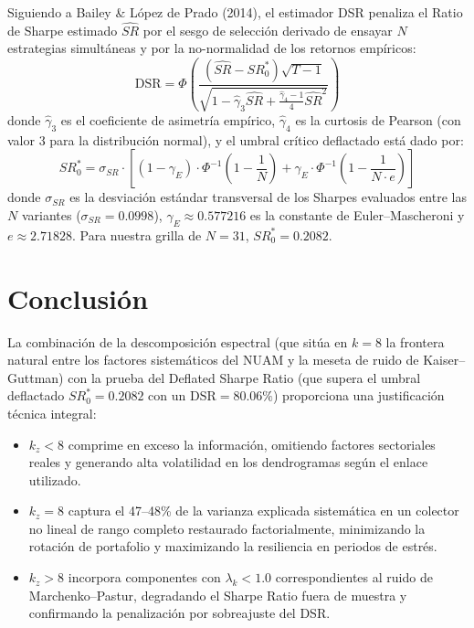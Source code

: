 \documentclass[11pt,a4paper]{article}
\begin{document}
Siguiendo a Bailey \& López de Prado (2014), el estimador DSR penaliza el Ratio de Sharpe estimado $\widehat{SR}$ por el sesgo de selección derivado de ensayar $N$ estrategias simultáneas y por la no-normalidad de los retornos empíricos:
\begin{equation}
\text{DSR} = \Phi\left( \frac{(\widehat{SR} - SR_0^*) \sqrt{T-1}}{\sqrt{1 - \hat{\gamma}_3 \widehat{SR} + \frac{\hat{\gamma}_4 - 1}{4} \widehat{SR}^2}} \right)
\end{equation}
donde $\hat{\gamma}_3$ es el coeficiente de asimetría empírico, $\hat{\gamma}_4$ es la curtosis de Pearson (con valor 3 para la distribución normal), y el umbral crítico deflactado está dado por:
\begin{equation}
SR_0^* = \sigma_{SR} \cdot \left[ (1 - \gamma_E) \cdot \Phi^{-1}\left(1 - \frac{1}{N}\right) + \gamma_E \cdot \Phi^{-1}\left(1 - \frac{1}{N \cdot e}\right) \right]
\end{equation}
donde $\sigma_{SR}$ es la desviación estándar transversal de los Sharpes evaluados entre las $N$ variantes ($\sigma_{SR} = 0.0998$), $\gamma_E \approx 0.577216$ es la constante de Euler--Mascheroni y $e \approx 2.71828$. Para nuestra grilla de $N = 31$, $SR_0^* = 0.2082$.

\section{Conclusión}

La combinación de la descomposición espectral (que sitúa en $k=8$ la frontera natural entre los factores sistemáticos del NUAM y la meseta de ruido de Kaiser--Guttman) con la prueba del Deflated Sharpe Ratio (que supera el umbral deflactado $SR_0^* = 0.2082$ con un $\text{DSR} = 80.06\%$) proporciona una justificación técnica integral:
\begin{itemize}
    \item $k_z < 8$ comprime en exceso la información, omitiendo factores sectoriales reales y generando alta volatilidad en los dendrogramas según el enlace utilizado.
    \item $k_z = 8$ captura el 47--48\% de la varianza explicada sistemática en un colector no lineal de rango completo restaurado factorialmente, minimizando la rotación de portafolio y maximizando la resiliencia en periodos de estrés.
    \item $k_z > 8$ incorpora componentes con $\lambda_k < 1.0$ correspondientes al ruido de Marchenko--Pastur, degradando el Sharpe Ratio fuera de muestra y confirmando la penalización por sobreajuste del DSR.
\end{itemize}
\end{document}

